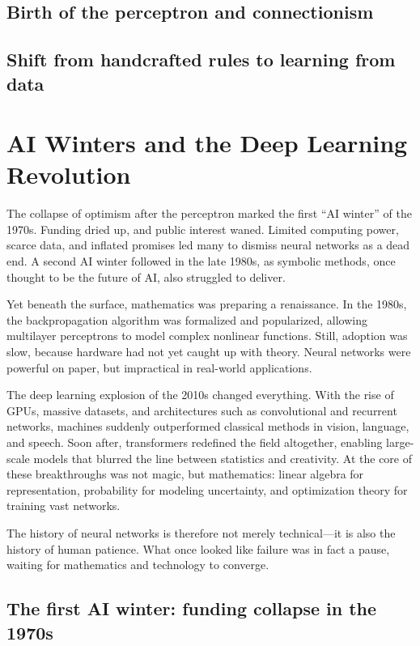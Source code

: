 \subsection{Birth of the perceptron and connectionism}
\subsection{Shift from handcrafted rules to learning from data}

\section{AI Winters and the Deep Learning Revolution}

The collapse of optimism after the perceptron marked the first ``AI winter'' of the 1970s. Funding dried up, and public interest waned. Limited computing power, scarce data, and inflated promises led many to dismiss neural networks as a dead end. A second AI winter followed in the late 1980s, as symbolic methods, once thought to be the future of AI, also struggled to deliver.

Yet beneath the surface, mathematics was preparing a renaissance. In the 1980s, the backpropagation algorithm was formalized and popularized, allowing multilayer perceptrons to model complex nonlinear functions. Still, adoption was slow, because hardware had not yet caught up with theory. Neural networks were powerful on paper, but impractical in real-world applications.

The deep learning explosion of the 2010s changed everything. With the rise of GPUs, massive datasets, and architectures such as convolutional and recurrent networks, machines suddenly outperformed classical methods in vision, language, and speech. Soon after, transformers redefined the field altogether, enabling large-scale models that blurred the line between statistics and creativity. At the core of these breakthroughs was not magic, but mathematics: linear algebra for representation, probability for modeling uncertainty, and optimization theory for training vast networks.

The history of neural networks is therefore not merely technical—it is also the history of human patience. What once looked like failure was in fact a pause, waiting for mathematics and technology to converge.

\subsection{The first AI winter: funding collapse in the 1970s}
